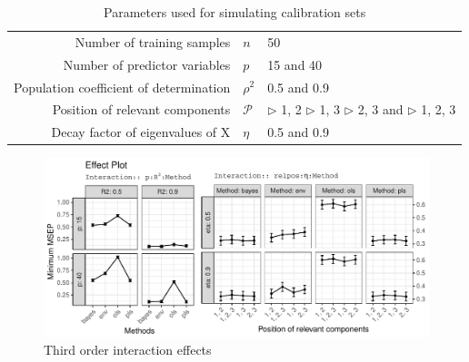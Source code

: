 \documentclass[12pt, a4paper]{article}
\begin{document}
\doublespacing

\begin{table}[ht]
  \centering
  \begin{tabular}{rll}
    Number of training samples              & $n$      & 50                \\
    Number of predictor variables           & $p$      & 15 and 40         \\
    Population coefficient of determination & $\rho^2$ & 0.5 and 0.9       \\
    Position of relevant components         & $\mathcal{P}$
                                            & $\triangleright$ 1, 2 \;
                                                         $\triangleright$ 1,  3 \; \newline
                                                         $\triangleright$ 2,  3 and \;
                                                         $\triangleright$ 1,  2, 3 \\
    Decay factor of eigenvalues of X        & $\eta$   & 0.5 and 0.9
  \end{tabular}
  \caption{Parameters used for simulating calibration sets}
  \label{tab:parameters}
\end{table}

\pagebreak

\begin{figure}[!ht]
  \centering
  \includegraphics[width=\textwidth]{pdf/effect-plot}
  \caption{Third order interaction effects}
  \label{fig:effect-plot}
\end{figure}

\pagebreak
\end{document}

